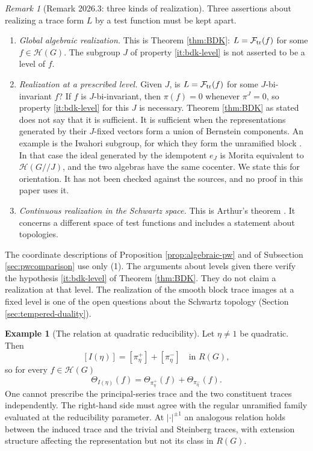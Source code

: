 \documentclass[12pt,letterpaper]{amsart}
\numberwithin{equation}{section}
\theoremstyle{definition}
\newtheorem{example}[theorem]{Example}
\theoremstyle{remark}
\newtheorem{remark}[theorem]{Remark}
\newcommand{\calH}{\mathcal H}
\begin{document}
\begin{remark}[Remark 2026.3: three kinds of realization]\label{rem:three-realizations}
Three assertions about realizing a trace form $L$ by a test function must be kept apart.
\begin{enumerate}[label=(\arabic*),leftmargin=*]
\item \emph{Global algebraic realization.} This is Theorem \ref{thm:BDK}: $L=\mathcal F_{\rm tr}(f)$ for some $f\in\calH(G)$. The subgroup $J$ of property \ref{it:bdk-level} is not asserted to be a level of $f$.
\item \emph{Realization at a prescribed level.} Given $J$, is $L=\mathcal F_{\rm tr}(f)$ for some $J$-bi-invariant $f$? If $f$ is $J$-bi-invariant, then $\pi(f)=0$ whenever $\pi^J=0$, so property \ref{it:bdk-level} for this $J$ is necessary. Theorem \ref{thm:BDK} as stated does not say that it is sufficient. It is sufficient when the representations generated by their $J$-fixed vectors form a union of Bernstein components. An example is the Iwahori subgroup, for which they form the unramified block \cite{Bo76}. In that case the ideal generated by the idempotent $e_J$ is Morita equivalent to $\calH(G/\!/J)$, and the two algebras have the same cocenter. We state this for orientation. It has not been checked against the sources, and no proof in this paper uses it.
\item \emph{Continuous realization in the Schwartz space.} This is Arthur's theorem \cite{Ar94}. It concerns a different space of test functions and includes a statement about topologies.
\end{enumerate}
The coordinate descriptions of Proposition \ref{prop:algebraic-pw} and of Subsection \ref{sec:pwcomparison} use only (1). The arguments about levels given there verify the hypothesis \ref{it:bdk-level} of Theorem \ref{thm:BDK}. They do not claim a realization at that level. The realization of the smooth block trace images at a fixed level is one of the open questions about the Schwartz topology (Section \ref{sec:tempered-duality}).
\end{remark}

\begin{example}[The relation at quadratic reducibility]\label{ex:matching}
Let $\eta\ne1$ be quadratic.  Then
\[
[I(\eta)]=[\pi_\eta^+]+[\pi_\eta^-]\quad\text{in }R(G),
\]
so for every $f\in\calH(G)$
\begin{equation}\label{eq:match}
\Theta_{I(\eta)}(f)=\Theta_{\pi_\eta^+}(f)+\Theta_{\pi_\eta^-}(f).
\end{equation}
One cannot prescribe the principal-series trace and the two constituent traces independently. The right-hand side must agree with the regular unramified family evaluated at the reducibility parameter.  At $|\cdot|^{\pm1}$ an analogous relation holds between the induced trace and the trivial and Steinberg traces, with extension structure affecting the representation but not its class in $R(G)$.
\end{example}
\end{document}
